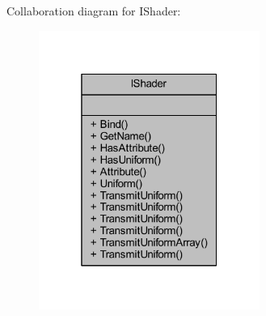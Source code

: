 Collaboration diagram for I\+Shader\+:\nopagebreak
\begin{figure}[H]
\begin{center}
\leavevmode
\includegraphics[width=205pt]{class_i_shader__coll__graph}
\end{center}
\end{figure}
